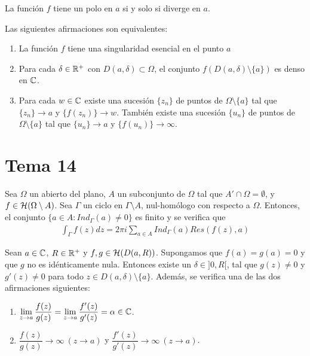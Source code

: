 \documentclass[12pt]{article}
\begin{document}
    \begin{prop}
        La función $f$ tiene un polo en $a$ si y solo si diverge en $a$.
    \end{prop}

    \begin{teo} Las siguientes afirmaciones son equivalentes:
    \begin{enumerate}
        \item La función $f$ tiene una singularidad esencial en el punto $a$
        \item Para cada $\delta \in \mathbb{R}^+$ con $D(a, \delta)\subset \Omega$, el conjunto $f(D(a, \delta)\setminus \{a\})$ es denso en $\mathbb{C}$.
        \item Para cada $w\in \mathbb{C}$ existe una sucesión $\{z_n\}$ de puntos de $\Omega \setminus \{a\}$ tal que $\{z_n\} \to a$ y $\{f(z_n)\}\to w$. También existe una sucesión $\{u_n\}$ de puntos de $\Omega \setminus \{a\}$ tal que $\{u_n\} \to a$ y $\{f(u_n)\} \to \infty$.
    \end{enumerate}
    \end{teo}

    \newpage

    \section{Tema 14}

    \begin{teo}
        Sea $\Omega$ un abierto del plano, $A$ un subconjunto de $\Omega$ tal que $A'\cap \Omega = \emptyset$, y $f\in \mathcal{H}(\Omega \setminus A)$. Sea $\Gamma$ un ciclo en $\Gamma \setminus A$, nul-homólogo con respecto a $\Omega$. Entonces, el conjunto $\{a\in A : Ind_\Gamma(a)\neq 0\}$ es finito y se verifica que
        \begin{gather*}
            \int_\Gamma f(z)dz = 2\pi i \sum\limits_{a\in A} Ind_\Gamma (a) Res(f(z), a)
        \end{gather*}
    \end{teo}

    \begin{teo} Sean $a\in \mathbb{C}$, $R\in \mathbb{R}^+$ y $f,g\in \mathcal{H}(D(a, R))$. Supongamos que $f(a)=g(a)=0$ y que $g$ no es idénticamente nula. Entonces existe un $\delta \in ]0,R[$, tal que $g(z)\neq 0$ y $g'(z)\neq 0$ para todo $z\in D(a, \delta)\setminus \{a\}$. Además, se verifica una de las dos afirmaciones siguientes:
    \begin{enumerate}
        \item $\displaystyle \lim\limits_{z\to a} \frac{f(z)}{g(z)} = \lim\limits_{z\to a} \frac{f'(z)}{g'(z)} = \alpha \in \mathbb{C}$.
        \item $\dfrac{f(z)}{g(z)} \to \infty\  (z \to a)$ y $\dfrac{f'(z)}{g'(z)} \to \infty\ (z \to a)$.
    \end{enumerate}
        
    \end{teo}
    
\end{document}
